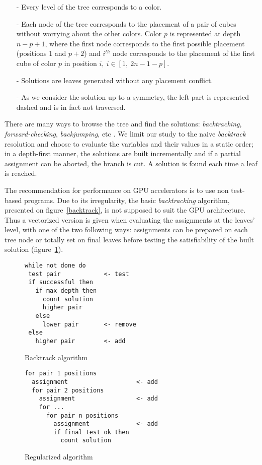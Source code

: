 \begin{itemize}   
\item[-] Every level of the tree corresponds to a color.
\item[-] Each node of the tree corresponds to the placement of a pair of cubes without worrying about the other colors. Color $p$ is represented at depth $n-p+1$, where the first node corresponds to the first possible placement (positions 1 and $p+2$) and $i^{th}$ node corresponds to the placement of the first cube of color $p$ in position $i, \ i \in [1, \ 2n-1-p]$.
\item[-] Solutions are leaves generated without any placement conflict.
\item[-] As we consider the solution up to a symmetry, the left part is represented dashed and is in fact not traversed.
\end{itemize}

There are many ways to browse the tree and find the solutions: \emph{backtracking}, \emph{forward-checking}, \emph{backjumping}, etc \cite{prosser93hybrid}. 
We limit our study to the naive \emph{backtrack} resolution and choose to evaluate the variables and their values in a static order; in a depth-first manner, the solutions are built incrementally and if a partial assignment can be aborted, the branch is cut. A solution is found each time a leaf is reached.

The recommendation for performance on GPU accelerators is to use non test-based programs.
Due to its irregularity, the basic \emph{backtracking} algorithm, presented on figure~\ref{backtrack}, is not supposed to suit the GPU architecture.
Thus a vectorized version is given when evaluating the assignments at the leaves' level, with one of the two following ways: assignments can be prepared on each tree node or totally set on final leaves before testing the satisfiability of the built solution (figure~\ref{regularized}).

\begin{figure}[t!]
\begin{minipage}[b]{0.45\linewidth}
\footnotesize
\begin{verbatim}
while not done do
 test pair            <- test
 if successful then 
   if max depth then
     count solution
     higher pair	                  
   else
     lower pair       <- remove
 else
   higher pair        <- add
\end{verbatim}
\caption{Backtrack algorithm}\label{backtrack}
\end{minipage}
\begin{minipage}[b]{0.45\linewidth}
\footnotesize
\begin{verbatim}
for pair 1 positions
  assignment                   <- add
  for pair 2 positions
    assignment                 <- add
    for ...
      for pair n positions
        assignment             <- add
        if final test ok then  
          count solution
\end{verbatim}
\caption{Regularized algorithm}\label{regularized}
\end{minipage}
\end{figure}

